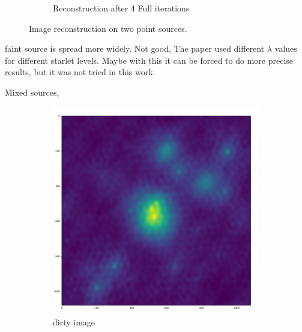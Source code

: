\begin{figure}[h]
\begin{subfigure}[b]{0.45\linewidth}
		\caption{Reconstruction after 4 Full iterations}
		\label{results:point:cd}
	\end{subfigure}
	\caption{Image reconstruction on two point sources.}
	\label{results:point}
\end{figure}

faint source is spread more widely. Not good, The paper \cite{starck2015starlet} used different $\lambda$ values for different starlet levels. Maybe with this it can be forced to do more precise results, but it was not tried in this work.


Mixed sources, 

\begin{figure}[h]
	\centering
	\begin{subfigure}[b]{0.45\linewidth}
		\includegraphics[width=\linewidth]{./chapters/05.algorithms/results/sim00_mixed_sources_dirty.png}
		\caption{dirty image}
		\label{results:g55:nrao:rec}
	\end{subfigure}
	\begin{subfigure}[b]{0.45\linewidth}

\end{subfigure}
\end{figure}
